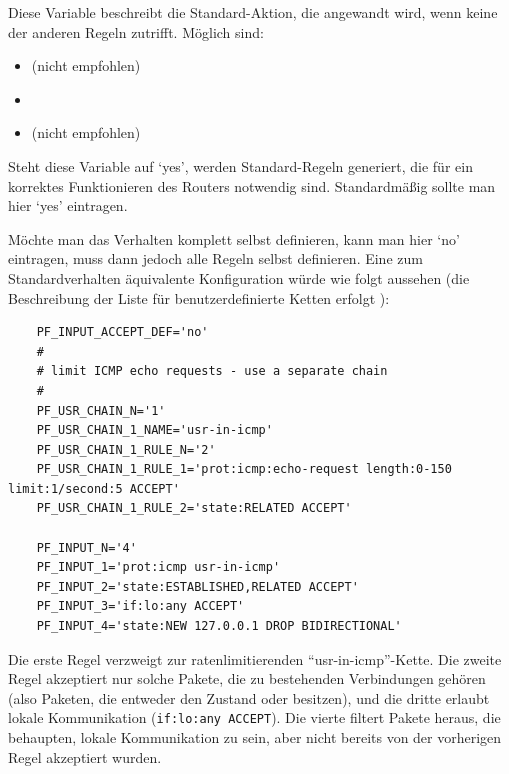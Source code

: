 \begin{description}
Diese Variable beschreibt die Standard-Aktion, die angewandt wird,
wenn keine der anderen Regeln zutrifft. Möglich sind:

\begin{itemize}
\item {} (nicht empfohlen)
\item {}
\item {} (nicht empfohlen)
\end{itemize}

Steht diese Variable auf `yes', werden Standard-Regeln generiert, die
für ein korrektes Funktionieren des Routers notwendig
sind. Standardmäßig sollte man hier `yes' eintragen.

Möchte man das Verhalten komplett selbst definieren, kann man
hier `no' eintragen, muss dann jedoch alle Regeln selbst definieren.
Eine zum Standardverhalten äquivalente Konfiguration würde wie folgt
aussehen (die Beschreibung der Liste für benutzerdefinierte Ketten erfolgt
):

\begin{example}
{\footnotesize
\begin{verbatim}
    PF_INPUT_ACCEPT_DEF='no'
    #
    # limit ICMP echo requests - use a separate chain
    #
    PF_USR_CHAIN_N='1'
    PF_USR_CHAIN_1_NAME='usr-in-icmp'
    PF_USR_CHAIN_1_RULE_N='2'
    PF_USR_CHAIN_1_RULE_1='prot:icmp:echo-request length:0-150 limit:1/second:5 ACCEPT'
    PF_USR_CHAIN_1_RULE_2='state:RELATED ACCEPT'

    PF_INPUT_N='4'
    PF_INPUT_1='prot:icmp usr-in-icmp'
    PF_INPUT_2='state:ESTABLISHED,RELATED ACCEPT'
    PF_INPUT_3='if:lo:any ACCEPT'
    PF_INPUT_4='state:NEW 127.0.0.1 DROP BIDIRECTIONAL'
\end{verbatim}}
\end{example}

Die erste Regel verzweigt zur ratenlimitierenden ``usr-in-icmp''-Kette.
Die zweite Regel akzeptiert nur solche Pakete, die zu bestehenden Verbindungen
gehören (also Paketen, die entweder den Zustand  oder
 besitzen), und die dritte erlaubt lokale Kommunikation
(\verb+if:lo:any ACCEPT+). Die vierte filtert Pakete heraus,
die behaupten, lokale Kommunikation zu sein, aber nicht bereits von
der vorherigen Regel akzeptiert wurden.


\end{description}
